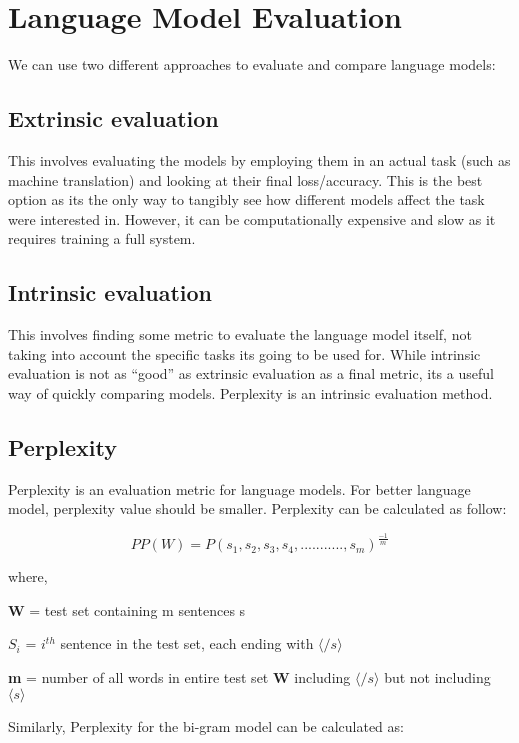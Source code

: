 \section{Language Model Evaluation}
We can use two different approaches to evaluate and compare language models:

\subsection{Extrinsic evaluation}
This involves evaluating the models by employing them in an actual task (such as machine translation) and looking at their final loss/accuracy. This is the best option as it\textquotesingle s the only way to tangibly see how different models affect the task we\textquotesingle re interested in. However, it can be computationally expensive and slow as it requires training a full system.

\subsection{Intrinsic evaluation}
This involves finding some metric to evaluate the language model itself, not taking into account the specific tasks it\textquotesingle s going to be used for. While intrinsic evaluation is not as “good” as extrinsic evaluation as a final metric, it\textquotesingle s a useful way of quickly comparing models. Perplexity is an intrinsic evaluation method.

\subsection{Perplexity}
Perplexity is an evaluation metric for language models. For better language model, perplexity value should be smaller. Perplexity can be calculated as follow:

\begin{equation}
	PP(W) = P(s_1, s_2, s_3, s_4, ..........., s_m)^{\frac{-1}{m}}
\end{equation}

where,

\textbf{W} = test set containing m sentences s

\textbf{$S_i$} = $i^{th}$ sentence in the test set, each ending with $\langle /s \rangle$

\textbf{m} = number of all words in entire test set \textbf{W} including $\langle /s \rangle$ but not including $\langle s \rangle$

Similarly, Perplexity for the bi-gram model can be calculated as:

